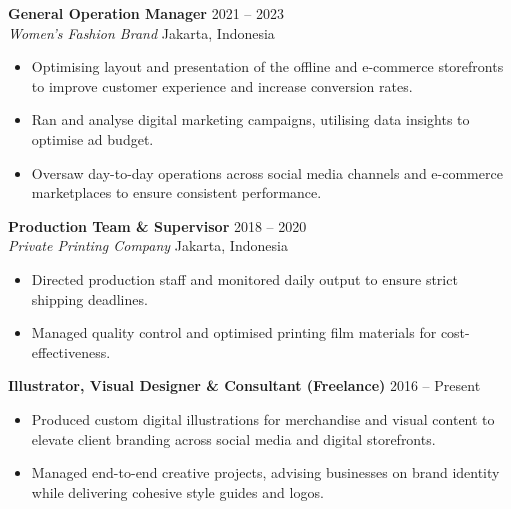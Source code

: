 \documentclass[10pt,a4paper]{article}
\begin{document}
\vspace{0.4cm}

\noindent\textbf{General Operation Manager} \hfill 2021 -- 2023 \\
\textit{Women's Fashion Brand} \hfill Jakarta, Indonesia
\begin{itemize}[noitemsep, topsep=0pt]
    \item Optimising layout and presentation of the offline and e-commerce storefronts to improve customer experience and increase conversion rates.
    \item Ran and analyse digital marketing campaigns, utilising data insights to optimise ad budget.
    \item Oversaw day-to-day operations across social media channels and e-commerce marketplaces to ensure consistent performance.
\end{itemize}

\vspace{0.4cm}

\noindent\textbf{Production Team \& Supervisor} \hfill 2018 -- 2020 \\
\textit{Private Printing Company} \hfill Jakarta, Indonesia
\begin{itemize}[noitemsep, topsep=0pt]
    \item Directed production staff and monitored daily output to ensure strict shipping deadlines.
    \item Managed quality control and optimised printing film materials for cost-effectiveness.
\end{itemize}

\vspace{0.4cm}

\noindent\textbf{Illustrator, Visual Designer \& Consultant (Freelance)} \hfill 2016 -- Present
\begin{itemize}[noitemsep, topsep=0pt]
    \item Produced custom digital illustrations for merchandise and visual content to elevate client branding across social media and digital storefronts.
    \item Managed end-to-end creative projects, advising businesses on brand identity while delivering cohesive style guides and logos.
\end{itemize}

\vspace{0.4cm}
\end{document}
